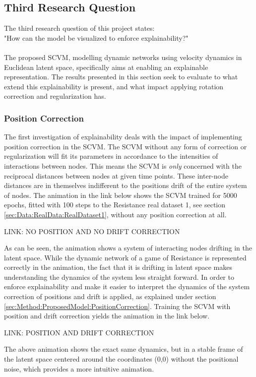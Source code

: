 \subsection{Third Research Question}
\label{sec:ResearchQuestion3}
The third research question of this project states:
\\
"How can the model be visualized to enforce explainability?"
\\\\
The proposed SCVM, modelling dynamic networks using velocity dynamics in Euclidean latent space, specifically aims at enabling an explainable representation.
The results presented in this section seek to evaluate to what extend this explainability is present, and what impact applying rotation correction and regularization has.


\subsubsection{Position Correction}
\label{sec:ResearchQuestion3:PositionCorrection}
The first investigation of explainability deals with the impact of implementing position correction in the SCVM.
The SCVM without any form of correction or regularization will fit its parameters in accordance to the intensities of interactions between nodes.
This means the SCVM is \textit{only} concerned with the reciprocal distances between nodes at given time points.
These inter-node distances are in themselves indifferent to the positions drift of the entire system of nodes.
The animation in the link below shows the SCVM trained for 5000 epochs, fitted with 100 steps to the Resistance real dataset 1, see section \ref{sec:Data:RealData:RealDataset1}, without any position correction at all.
\begin{center}
LINK: NO POSITION AND NO DRIFT CORRECTION
\end{center}
\noindent
As can be seen, the animation shows a system of interacting nodes drifting in the latent space.
While the dynamic network of a game of Resistance is represented correctly in the animation, the fact that it is drifting in latent space makes understanding the dynamics of the system less straight forward.
In order to enforce explainability and make it easier to interpret the dynamics of the system correction of positions and drift is applied, as explained under section \ref{sec:Method:ProposedModel:PositionCorrection}.
Training the SCVM with position and drift correction yields the animation in the link below.
\begin{center}
LINK: POSITION AND DRIFT CORRECTION
\end{center}
\noindent
The above animation shows the exact same dynamics, but in a stable frame of the latent space centered around the coordinates (0,0) without the positional noise, which provides a more intuitive animation.


